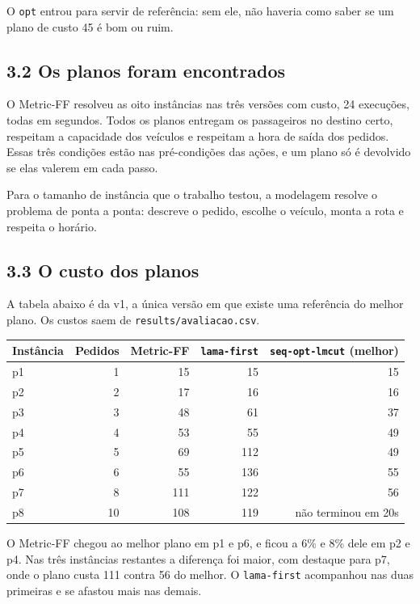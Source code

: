 \documentclass[11pt,a4paper]{article}
\newcommand{\cod}[1]{\texttt{#1}}
\begin{document}
O \cod{opt} entrou para servir de referência: sem ele, não haveria como saber se um plano de custo 45 é bom ou ruim.

\subsection*{3.2 Os planos foram encontrados}

O Metric-FF resolveu as oito instâncias nas três versões com custo, 24 execuções, todas em segundos. Todos os planos entregam os passageiros no destino certo, respeitam a capacidade dos veículos e respeitam a hora de saída dos pedidos. Essas três condições estão nas pré-condições das ações, e um plano só é devolvido se elas valerem em cada passo.

Para o tamanho de instância que o trabalho testou, a modelagem resolve o problema de ponta a ponta: descreve o pedido, escolhe o veículo, monta a rota e respeita o horário.

\subsection*{3.3 O custo dos planos}

A tabela abaixo é da v1, a única versão em que existe uma referência do melhor plano. Os custos saem de \cod{results/avaliacao.csv}.

\begin{center}
\begin{tabular}{lrrrr}
\toprule
Instância & Pedidos & Metric-FF & \cod{lama-first} & \cod{seq-opt-lmcut} (melhor) \\
\midrule
p1 & 1  & 15  & 15  & 15 \\
p2 & 2  & 17  & 16  & 16 \\
p3 & 3  & 48  & 61  & 37 \\
p4 & 4  & 53  & 55  & 49 \\
p5 & 5  & 69  & 112 & 49 \\
p6 & 6  & 55  & 136 & 55 \\
p7 & 8  & 111 & 122 & 56 \\
p8 & 10 & 108 & 119 & não terminou em 20s \\
\bottomrule
\end{tabular}
\end{center}

O Metric-FF chegou ao melhor plano em p1 e p6, e ficou a 6\% e 8\% dele em p2 e p4. Nas três instâncias restantes a diferença foi maior, com destaque para p7, onde o plano custa 111 contra 56 do melhor. O \cod{lama-first} acompanhou nas duas primeiras e se afastou mais nas demais.
\end{document}

